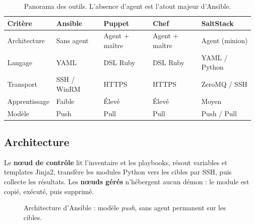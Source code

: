 \documentclass[11pt,a4paper]{article}
\begin{document}
\begin{table}[h]\centering\small
\begin{tabular}{@{}lllll@{}}
\toprule
\textbf{Critère} & \textbf{Ansible} & \textbf{Puppet} & \textbf{Chef} & \textbf{SaltStack}\\
\midrule
Architecture & Sans agent & Agent + maître & Agent + maître & Agent (minion)\\
Langage & YAML & DSL Ruby & DSL Ruby & YAML / Python\\
Transport & SSH / WinRM & HTTPS & HTTPS & ZeroMQ / SSH\\
Apprentissage & Faible & Élevé & Élevé & Moyen\\
Modèle & Push & Pull & Pull & Push / Pull\\
\bottomrule
\end{tabular}
\caption{Panorama des outils. L'absence d'agent est l'atout majeur d'Ansible.}
\end{table}

\subsection{Architecture}
Le \textbf{n\oe{}ud de contrôle} lit l'inventaire et les playbooks, résout variables et templates Jinja2,
transfère les modules Python vers les cibles par SSH, puis collecte les résultats. Les \textbf{n\oe{}uds
gérés} n'hébergent aucun démon : le module est copié, exécuté, puis supprimé.

\begin{figure}[h]\centering
{}
\caption{Architecture d'Ansible : modèle \emph{push}, sans agent permanent sur les cibles.}
\end{figure}
\end{document}
